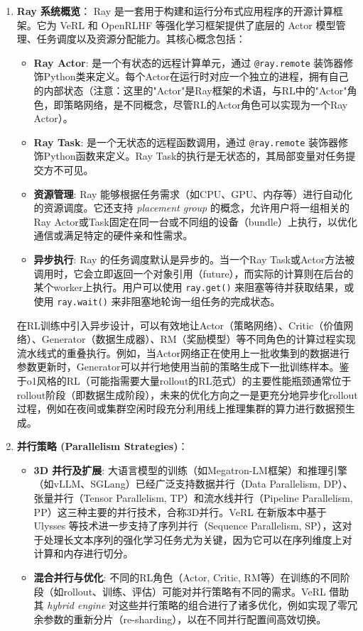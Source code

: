 \documentclass{article}
\begin{document}
\begin{enumerate}
    \item \textbf{Ray 系统概览}：
    Ray 是一套用于构建和运行分布式应用程序的开源计算框架。它为 VeRL 和 OpenRLHF 等强化学习框架提供了底层的 Actor 模型管理、任务调度以及资源分配能力。其核心概念包括：
    \begin{itemize}
        \item \textbf{Ray Actor}: 是一个有状态的远程计算单元，通过 \texttt{@ray.remote} 装饰器修饰Python类来定义。每个Actor在运行时对应一个独立的进程，拥有自己的内部状态（注意：这里的"Actor"是Ray框架的术语，与RL中的"Actor"角色，即策略网络，是不同概念，尽管RL的Actor角色可以实现为一个Ray Actor）。
        \item \textbf{Ray Task}: 是一个无状态的远程函数调用，通过 \texttt{@ray.remote} 装饰器修饰Python函数来定义。Ray Task的执行是无状态的，其局部变量对任务提交方不可见。
        \item \textbf{资源管理}: Ray 能够根据任务需求（如CPU、GPU、内存等）进行自动化的资源调度。它还支持 \textit{placement group} 的概念，允许用户将一组相关的Ray Actor或Task固定在同一台或不同组的设备（bundle）上执行，以优化通信或满足特定的硬件亲和性需求。
        \item \textbf{异步执行}: Ray 的任务调度默认是异步的。当一个Ray Task或Actor方法被调用时，它会立即返回一个对象引用（future），而实际的计算则在后台的某个worker上执行。用户可以使用 \texttt{ray.get()} 来阻塞等待并获取结果，或使用 \texttt{ray.wait()} 来非阻塞地轮询一组任务的完成状态。
    \end{itemize}
    在RL训练中引入异步设计，可以有效地让Actor（策略网络）、Critic（价值网络）、Generator（数据生成器）、RM（奖励模型）等不同角色的计算过程实现流水线式的重叠执行。例如，当Actor网络正在使用上一批收集到的数据进行参数更新时，Generator可以并行地使用当前的策略生成下一批训练样本。鉴于o1风格的RL（可能指需要大量rollout的RL范式）的主要性能瓶颈通常位于rollout阶段（即数据生成阶段），未来的优化方向之一是更充分地异步化rollout过程，例如在夜间或集群空闲时段充分利用线上推理集群的算力进行数据预生成。

    \item \textbf{并行策略 (Parallelism Strategies)}：
    \begin{itemize}
        \item \textbf{3D 并行及扩展}: 大语言模型的训练（如Megatron-LM框架）和推理引擎（如vLLM、SGLang）已经广泛支持数据并行（Data Parallelism, DP）、张量并行（Tensor Parallelism, TP）和流水线并行（Pipeline Parallelism, PP）这三种主要的并行技术，合称3D并行。VeRL 在新版本中基于 Ulysses 等技术进一步支持了序列并行（Sequence Parallelism, SP），这对于处理长文本序列的强化学习任务尤为关键，因为它可以在序列维度上对计算和内存进行切分。
        \item \textbf{混合并行与优化}: 不同的RL角色（Actor, Critic, RM等）在训练的不同阶段（如rollout、训练、评估）可能对并行策略有不同的需求。VeRL 借助其 \emph{hybrid engine} 对这些并行策略的组合进行了诸多优化，例如实现了零冗余参数的重新分片（re-sharding），以在不同并行配置间高效切换。
    \end{itemize}


\end{enumerate}
\end{document}
